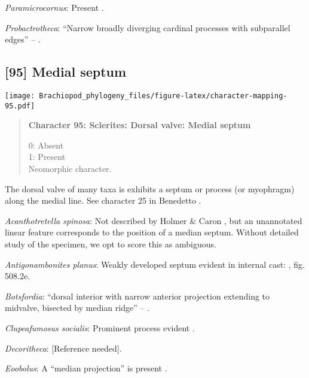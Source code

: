 \documentclass[openany]{book}
\theoremstyle{definition}
\theoremstyle{definition}
\theoremstyle{definition}
\theoremstyle{remark}
\begin{document}
\hypertarget{Paramicrocornus-coding-94}{}
\emph{Paramicrocornus}: Present \citep{Zhang2018Ahyolithid}.

\hypertarget{Probactrotheca-coding-94}{}
\emph{Probactrotheca}: ``Narrow broadly diverging cardinal processes
with subparallel edges'' -- \citet{Valent2012}.

\subsection*{{[}95{]} Medial septum}\label{medial-septum}

\texttt{[image: Brachiopod\_phylogeny\_files/figure-latex/character-mapping-95.pdf]}

\begin{quote}
\textbf{Character 95: Sclerites: Dorsal valve: Medial septum}

0: Absent\\
1: Present\\
Neomorphic character.
\end{quote}

The dorsal valve of many taxa is exhibits a septum or process (or
myophragm) along the medial line. See character 25 in Benedetto
\citeyearpar{Benedetto2009iChaniella}.

\hypertarget{Acanthotretella_spinosa-coding-95}{}
\emph{Acanthotretella spinosa}: Not described by Holmer \& Caron
\citeyearpar{Holmer2006Aspinose}, but an unannotated linear feature
corresponds to the position of a median septum. Without detailed study
of the specimen, we opt to score this as ambiguous.

\hypertarget{Antigonambonites_planus-coding-95}{}
\emph{Antigonambonites planus}: Weakly developed septum evident in
internal cast: \citet{Williams2000LinguliformeaCraniiformea}, fig.
508.2e.

\hypertarget{Botsfordia-coding-95}{}
\emph{Botsfordia}: ``dorsal interior with narrow anterior projection
extending to midvalve, bisected by median ridge'' --
\citet{Williams2000LinguliformeaCraniiformea}.

\hypertarget{Clupeafumosus_socialis-coding-95}{}
\emph{Clupeafumosus socialis}: Prominent process evident
\citep{Topper2013Reappraisalof}.

\hypertarget{Decoritheca-coding-95}{}
\emph{Decoritheca}: {[}Reference needed{]}.

\hypertarget{Eoobolus-coding-95}{}
\emph{Eoobolus}: A ``median projection'' is present \citep[fig. 4g
in][]{Balthasar2009Thebrachiopod}.
\end{document}
